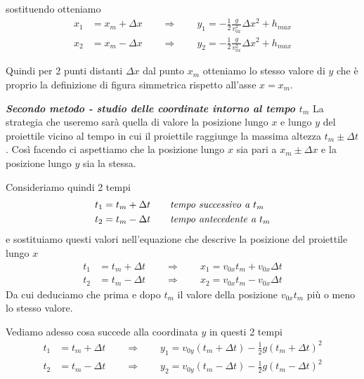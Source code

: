 \documentclass{article}
\begin{document}
sostituendo otteniamo
\begin{align}
  x_1 &= x_m + \Delta x \qquad \Rightarrow \qquad y_1 = -\frac{1}{2}\frac{g}{v_{0x}^2} \Delta x^2 + h_{max} \\
  x_2 &= x_m - \Delta x \qquad \Rightarrow \qquad y_2 = -\frac{1}{2}\frac{g}{v_{0x}^2} \Delta x^2 + h_{max}
\end{align}

Quindi per 2 punti distanti $\Delta x$ dal punto $x_m$ otteniamo lo stesso valore di $y$ che è proprio la definizione di figura simmetrica rispetto all'asse $x=x_m$.

\textbf{\textit{Secondo metodo - studio delle coordinate intorno al tempo $t_m$}}
\newline
La strategia che useremo sarà quella di valore la posizione lungo $x$ e lungo $y$ del proiettile vicino al tempo in cui il proiettile raggiunge la massima altezza $t_m \pm \Delta t$. Così facendo ci aspettiamo che la posizione lungo $x$ sia pari a $x_m \pm \Delta x$ e la posizione lungo $y$ sia la stessa.

Consideriamo quindi 2 tempi
\begin{align}
  t_1 &= t_m + \Delta t \qquad \text{\textit{tempo successivo a $t_m$}} \\
  t_2 &= t_m - \Delta t \qquad \text{\textit{tempo antecedente a $t_m$}}
\end{align}
e sostituiamo questi valori nell'equazione che descrive la posizione del proiettile lungo $x$
\begin{align}
  t_1 &= t_m + \Delta t \qquad \Rightarrow \qquad x_1 = v_{0x} t_m + v_{0x} \Delta t\\
  t_2 &= t_m - \Delta t \qquad \Rightarrow \qquad x_2 = v_{0x} t_m - v_{0x} \Delta t
\end{align}
Da cui deduciamo che prima e dopo $t_m$ il valore della posizione $v_{0x}t_m$ più o meno lo stesso valore.

Vediamo adesso cosa succede alla coordinata $y$ in questi 2 tempi
\begin{align}
  t_1 &= t_m + \Delta t \qquad \Rightarrow \qquad y_1 = v_{0y} (t_m + \Delta t) - \frac{1}{2}g(t_m + \Delta t)^2 \\
  t_2 &= t_m - \Delta t \qquad \Rightarrow \qquad y_2 = v_{0y} (t_m - \Delta t) - \frac{1}{2}g(t_m - \Delta t)^2
\end{align}
\end{document}

